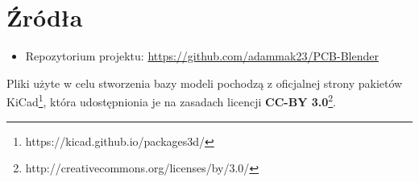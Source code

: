 \documentclass{xmgr}
\begin{document}



\listoftables

\listoffigures

\appendix
\chapter{Źródła} \label{linki}
\begin{itemize}
\item Repozytorium projektu: \url{https://github.com/adammak23/PCB-Blender}
\end{itemize}
\vspace{20mm}

\noindent Pliki użyte w celu stworzenia bazy modeli pochodzą z oficjalnej strony pakietów KiCad\footnote{https://kicad.github.io/packages3d/}, która udostępnionia je na zasadach licencji \textbf{CC-BY 3.0}\footnote{http://creativecommons.org/licenses/by/3.0/}.
\vspace{5mm}


\oswiadczenie
\end{document}
